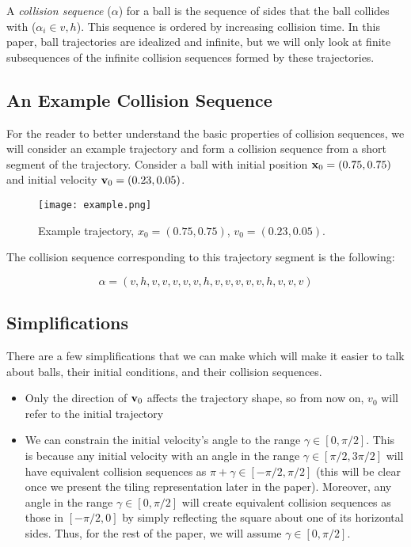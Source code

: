 \begin{definition}
  A \emph{collision sequence} ($\alpha$) for a ball is the sequence of sides that the ball collides with ($\alpha_i \in {v, h}$). This sequence is ordered by increasing collision time. In this paper, ball trajectories are idealized and infinite, but we will only look at finite subsequences of the infinite collision sequences formed by these trajectories.
\end{definition}

\subsection{An Example Collision Sequence}

For the reader to better understand the basic properties of collision sequences, we will consider an example trajectory and form a collision sequence from a short segment of the trajectory. Consider a ball with initial position $\mathbf{x}_0 = (0.75, 0.75)$ and initial velocity $\mathbf{v}_0 = (0.23, 0.05)$.

\begin{figure}[H]
  \begin{center}
    \texttt{[image: example.png]}
  \end{center}
  \vspace{-.2in} %
  \caption{\label{fig:example}Example trajectory, $x_0 = (0.75, 0.75)$, $v_0 = (0.23, 0.05)$.}
\end{figure}

The collision sequence corresponding to this trajectory segment is the following:

\begin{equation}
	\alpha = (v, h, v, v, v, v, v, h, v, v, v, v, v, h, v, v, v)
\end{equation}

\subsection{Simplifications}

There are a few simplifications that we can make which will make it easier to talk about balls, their initial conditions, and their collision sequences.

\begin{itemize}
  \item Only the direction of $\mathbf{v}_0$ affects the trajectory shape, so from now on, $v_0$ will refer to the initial trajectory
  \item We can constrain the initial velocity's angle to the range $\gamma \in [0, \pi/2]$. This is because any initial velocity with an angle in the range $\gamma \in [\pi/2, 3\pi/2]$ will have equivalent collision sequences as $\pi + \gamma \in [-\pi/2, \pi/2]$ (this will be clear once we present the tiling representation later in the paper). Moreover, any angle in the range $\gamma \in [0, \pi/2]$ will create equivalent collision sequences as those in $[-\pi/2, 0]$ by simply reflecting the square about one of its horizontal sides. Thus, for the rest of the paper, we will assume $\gamma \in [0, \pi/2]$.
\end{itemize}
